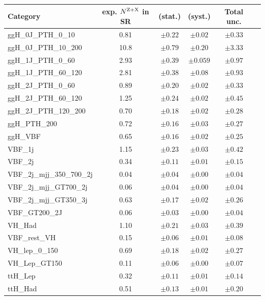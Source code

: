 \begin{table}[htb!]
\begin{center}
\small
\begin{tabular}{ l | c | c | c | c | c }
\hline
\hline
Category & exp. $N^{\rm Z+X}$ in SR & (stat.) & (syst.) & Total unc.\\
\hline
\hline
ggH\_0J\_PTH\_0\_10           & 0.81 & $\pm 0.22$ & $\pm 0.02 $  & $\pm 0.33 $ \\
\hline
ggH\_0J\_PTH\_10\_200    & 10.8 & $\pm 0.79$ & $\pm 0.20 $  & $\pm 3.33 $ \\
\hline
ggH\_1J\_PTH\_0\_60    & 2.93 & $\pm 0.39$ & $\pm 0.059 $  & $\pm 0.97 $ \\
\hline
ggH\_1J\_PTH\_60\_120    & 2.81 & $\pm 0.38$ & $\pm 0.08 $  & $\pm 0.93 $ \\
\hline
ggH\_2J\_PTH\_0\_60    & 0.89 & $\pm 0.20$ & $\pm 0.02 $  & $\pm 0.33 $ \\
\hline
ggH\_2J\_PTH\_60\_120    & 1.25 & $\pm 0.24$ & $\pm 0.02 $  & $\pm 0.45 $ \\
\hline
ggH\_2J\_PTH\_120\_200    & 0.70 & $\pm 0.18$ & $\pm 0.02 $  & $\pm 0.28 $ \\
\hline
ggH\_PTH\_200    & 0.72 & $\pm 0.16$ & $\pm 0.03 $  & $\pm 0.27 $ \\
\hline
ggH\_VBF    & 0.65 & $\pm 0.16$ & $\pm 0.02 $  & $\pm 0.25 $ \\
\hline
VBF\_1j    & 1.15 & $\pm 0.23$ & $\pm 0.03 $  & $\pm 0.42 $ \\
\hline
VBF\_2j    & 0.34 & $\pm 0.11$ & $\pm 0.01 $  & $\pm 0.15 $ \\
\hline
VBF\_2j\_mjj\_350\_700\_2j    & 0.04 & $\pm 0.04$ & $\pm 0.00 $  & $\pm 0.04 $ \\
\hline
VBF\_2j\_mjj\_GT700\_2j    & 0.06 & $\pm 0.04$ & $\pm 0.00 $  & $\pm 0.04 $ \\
\hline
VBF\_2j\_mjj\_GT350\_3j    & 0.63 & $\pm 0.17$ & $\pm 0.02 $  & $\pm 0.26 $ \\
\hline
VBF\_GT200\_2J    & 0.06 & $\pm 0.03$ & $\pm 0.00 $  & $\pm 0.04 $ \\
\hline
VH\_Had    & 1.10 & $\pm 0.21$ & $\pm 0.03 $  & $\pm 0.39 $ \\
\hline
VBF\_rest\_VH    & 0.15 & $\pm 0.06$ & $\pm 0.01 $  & $\pm 0.08 $ \\
\hline
VH\_lep\_0\_150    & 0.69 & $\pm 0.18$ & $\pm 0.02 $  & $\pm 0.27 $ \\
\hline
VH\_Lep\_GT150    & 0.11 & $\pm 0.06$ & $\pm 0.00 $  & $\pm 0.07 $ \\
\hline
ttH\_Lep    & 0.32 & $\pm 0.11$ & $\pm 0.01 $  & $\pm 0.14 $ \\
\hline
ttH\_Had    & 0.51 & $\pm 0.13$ & $\pm 0.01 $  & $\pm 0.20 $ \\
\hline


\end{tabular}
\end{center}
\end{table}

